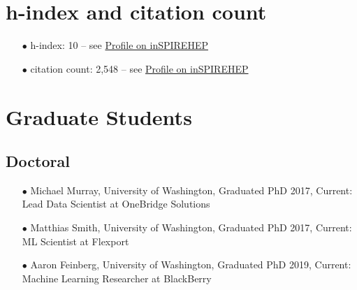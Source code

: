\documentclass{article}[10pt]
\begin{document}
\section*{h-index and citation count}
\begin{itemize}
\item [$\bullet$] h-index: 10 -- see \href{https://inspirehep.net/authors/1191633}{Profile on inSPIREHEP}
\item [$\bullet$] citation count: 2,548 -- see \href{https://inspirehep.net/authors/1191633}{Profile on inSPIREHEP}
\end{itemize}


\section*{Graduate Students} %
\subsection*{Doctoral}
\begin{itemize}
\item [$\bullet$] Michael Murray, University of Washington, Graduated PhD 2017, Current: Lead Data Scientist at OneBridge Solutions
\item [$\bullet$] Matthias Smith, University of Washington, Graduated PhD 2017, Current: ML Scientist at Flexport 
\item [$\bullet$] Aaron Feinberg, University of Washington, Graduated PhD 2019, Current: Machine Learning Researcher at BlackBerry
\end{itemize}
\end{document}
